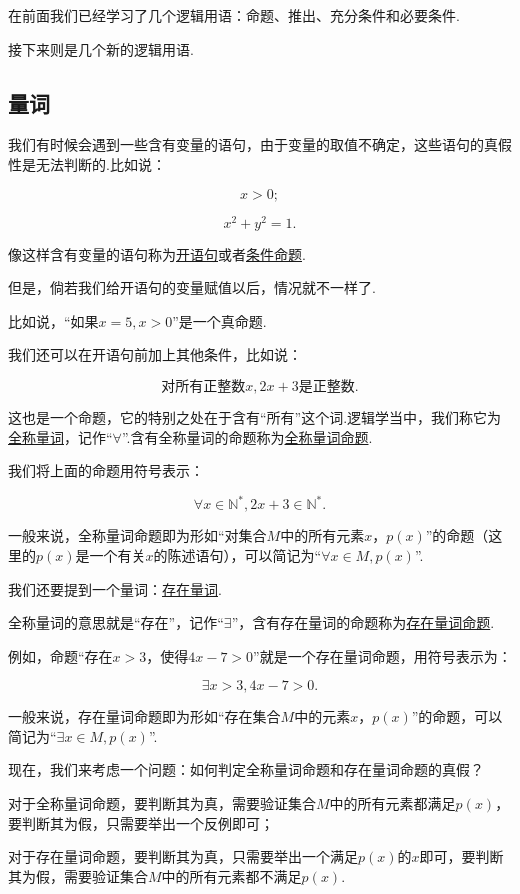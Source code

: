\documentclass[lang=cn,math=cm,chinesefont=nofont,11pt,scheme=chinese,twocol]{elegantbook}
\begin{document}
在前面我们已经学习了几个逻辑用语：命题、推出、充分条件和必要条件.

接下来则是几个新的逻辑用语.

\subsection{量词}

我们有时候会遇到一些含有变量的语句，由于变量的取值不确定，这些语句的真假性是无法判断的.比如说：

$$x>0;$$

$$x^2+y^2=1.$$

像这样含有变量的语句称为\underline{开语句}或者\underline{条件命题}.

但是，倘若我们给开语句的变量赋值以后，情况就不一样了.

比如说，“如果$x=5,x>0$”是一个真命题.

我们还可以在开语句前加上其他条件，比如说：

$$\text{对所有正整数}x,2x+3\text{是正整数.}$$

这也是一个命题，它的特别之处在于含有“所有”这个词.逻辑学当中，我们称它为\underline{全称量词}，记作“$\forall$”.含有全称量词的命题称为\underline{全称量词命题}.

我们将上面的命题用符号表示：

$$\forall x\in\mathbb{N}^*,2x+3\in\mathbb{N}^*.$$

一般来说，全称量词命题即为形如“对集合$M$中的所有元素$x$，$p(x)$”的命题（这里的$p(x)$是一个有关$x$的陈述语句），可以简记为“$\forall x\in M,p(x)$”.

\hspace*{\fill}

我们还要提到一个量词：\underline{存在量词}.

全称量词的意思就是“存在”，记作“$\exists$”，含有存在量词的命题称为\underline{存在量词命题}.

例如，命题“存在$x>3$，使得$4x-7>0$”就是一个存在量词命题，用符号表示为：

$$\exists x>3,4x-7>0.$$

一般来说，存在量词命题即为形如“存在集合$M$中的元素$x$，$p(x)$”的命题，可以简记为“$\exists x\in M,p(x)$”.

现在，我们来考虑一个问题：如何判定全称量词命题和存在量词命题的真假？

对于全称量词命题，要判断其为真，需要验证集合$M$中的所有元素都满足$p(x)$，要判断其为假，只需要举出一个反例即可；

对于存在量词命题，要判断其为真，只需要举出一个满足$p(x)$的$x$即可，要判断其为假，需要验证集合$M$中的所有元素都不满足$p(x)$.
\end{document}

